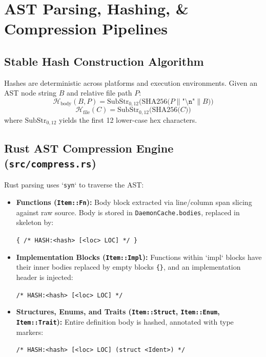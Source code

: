 \documentclass[11pt,a4paper]{article}
\begin{document}
\section{AST Parsing, Hashing, \& Compression Pipelines}

\subsection{Stable Hash Construction Algorithm}
Hashes are deterministic across platforms and execution environments. Given an AST node string $B$ and relative file path $P$:
\begin{equation}
\mathcal{H}_{\text{body}}(B, P) = \text{SubStr}_{0, 12}\Big(\text{SHA256}\big(P \parallel \texttt{"\textbackslash n"} \parallel B\big)\Big)
\end{equation}
\begin{equation}
\mathcal{H}_{\text{file}}(C) = \text{SubStr}_{0, 12}\Big(\text{SHA256}\big(C\big)\Big)
\end{equation}
where $\text{SubStr}_{0, 12}$ yields the first 12 lower-case hex characters.

\subsection{Rust AST Compression Engine (\texorpdfstring{\texttt{src/compress.rs}}{src/compress.rs})}
Rust parsing uses `\texttt{syn}` to traverse the AST:
\begin{itemize}[leftmargin=*]
    \item \textbf{Functions (\texttt{Item::Fn}):} Body block extracted via line/column span slicing against raw source. Body is stored in \texttt{DaemonCache.bodies}, replaced in skeleton by:
    \begin{center}
    \texttt{\{ /* HASH:<hash> [<loc> LOC] */ \}}
    \end{center}
    \item \textbf{Implementation Blocks (\texttt{Item::Impl}):} Functions within `impl` blocks have their inner bodies replaced by empty blocks \texttt{\{\}}, and an implementation header is injected:
    \begin{center}
    \texttt{/* HASH:<hash> [<loc> LOC] */}
    \end{center}
    \item \textbf{Structures, Enums, and Traits (\texttt{Item::Struct}, \texttt{Item::Enum}, \texttt{Item::Trait}):} Entire definition body is hashed, annotated with type markers:
    \begin{center}
    \texttt{/* HASH:<hash> [<loc> LOC] (struct <Ident>) */}
    \end{center}
\end{itemize}
\end{document}
